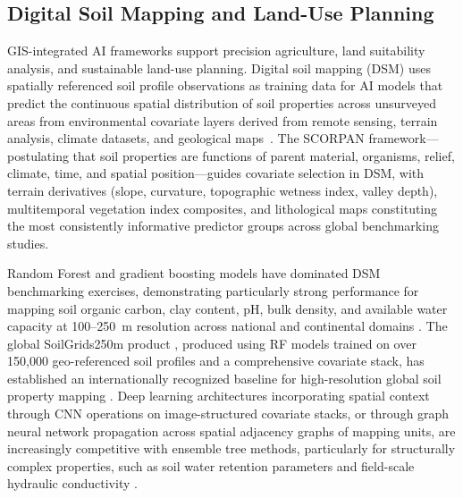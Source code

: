 \documentclass[land,review,accept,pdftex,oneauthor]{Definitions/mdpi}
\begin{document}
\subsection{Digital Soil Mapping and Land-Use Planning}\label{sec5.5}

GIS-integrated AI frameworks support precision agriculture, land suitability analysis, and sustainable land-use planning. Digital soil mapping (DSM) uses spatially referenced soil profile observations as training data for AI models that predict the continuous spatial distribution of soil properties across unsurveyed areas from environmental covariate layers derived from remote sensing, terrain analysis, climate datasets, and geological maps~\citep{mcbratney2003digital}. The SCORPAN framework---postulating that soil properties are functions of parent material, organisms, relief, climate, time, and spatial position---guides covariate selection in DSM, with terrain derivatives (slope, curvature, topographic wetness index, valley depth), multitemporal vegetation index composites, and lithological maps constituting the most consistently informative predictor groups across global benchmarking studies.

Random Forest and gradient boosting models have dominated DSM benchmarking exercises, demonstrating particularly strong performance for mapping soil organic carbon, clay content, pH, bulk density, and available water capacity at 100--250~m resolution across national and continental domains \citep{Hengl2017}. The global SoilGrids250m product%
, produced using RF models trained on over 150,000 geo-referenced soil profiles and a comprehensive covariate stack, has established an internationally recognized baseline for high-resolution global soil property mapping {\citep{Hengl2017,mcbratney2003digital}}. Deep learning architectures incorporating spatial context through CNN operations on image-structured covariate stacks, or through graph neural network propagation across spatial adjacency graphs of mapping units, are increasingly competitive with ensemble tree methods, particularly for structurally complex properties, such as soil water retention parameters and field-scale hydraulic conductivity {\citep{Padarian2019,Wadoux2020,hong2021multimodal}}.
\end{document}
